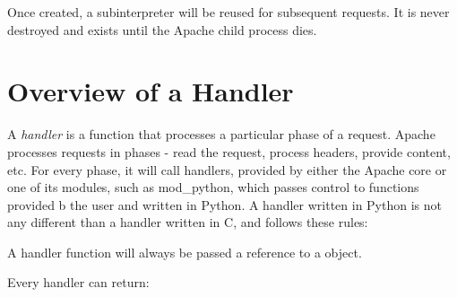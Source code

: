 Once created, a subinterpreter will be reused for subsequent requests.
It is never destroyed and exists until the Apache child process dies.

\section{Overview of a Handler\label{pyapi-handler}}

A \emph{handler} is a function that processes a particular phase of a
request. Apache processes requests in phases - read the request,
process headers, provide content, etc. For every phase, it will call
handlers, provided by either the Apache core or one of its modules,
such as mod_python, which passes control to functions provided b the
user and written in Python. A handler written in Python is not any
different than a handler written in C, and follows these rules:

A handler function will always be passed a reference to a  object. 

Every handler can return:

